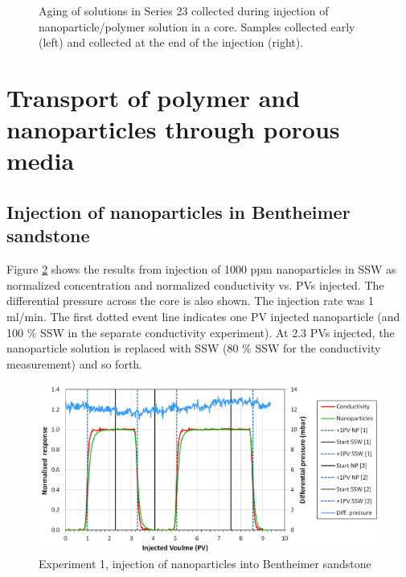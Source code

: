 \begin{figure} 
    \centering
    \caption{Aging of solutions in Series 23 collected during injection of nanoparticle/polymer solution in a core. Samples collected early (left) and collected at the end of the injection (right).}
    \label{cht:s23visc80}
\end{figure}

\section{Transport of polymer and nanoparticles through porous media}
\subsection{Injection of nanoparticles in Bentheimer sandstone}
  Figure \ref{cht:injexp1} shows the results from injection of 1000 ppm nanoparticles in SSW as normalized concentration and normalized conductivity vs. PVs injected. The differential pressure across the core is also shown. The injection rate was 1 ml/min. The first dotted event line indicates one PV injected nanoparticle (and 100 \% SSW in the separate conductivity experiment). At 2.3 PVs injected, the nanoparticle solution is replaced with SSW (80 \% SSW for the conductivity measurement) and so forth.

\begin{figure}[h]
    \centering
    \includegraphics[width=\textwidth]{img/cht/injexp1bent.png}
    \caption{Experiment 1, injection of nanoparticles into Bentheimer sandstone}
    \label{cht:injexp1}
\end{figure}

